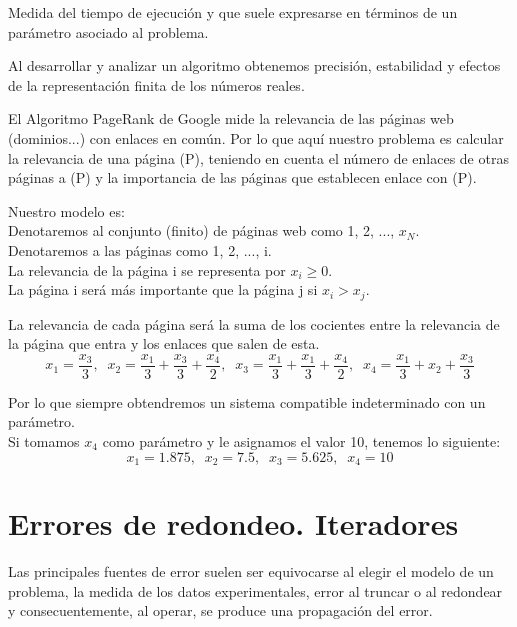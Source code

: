 \begin{ndef}
Medida del tiempo de ejecución y que suele expresarse en términos de un parámetro asociado al problema.
\end{ndef}

Al desarrollar y analizar un algoritmo obtenemos precisión, estabilidad y efectos de la representación finita de los números reales.

El Algoritmo PageRank de Google mide la relevancia de las páginas web (dominios...) con enlaces en común. Por lo que aquí nuestro problema es calcular la relevancia de una página (P), teniendo en cuenta el número de enlaces de otras páginas a (P) y la importancia de las páginas que establecen enlace con (P).

Nuestro modelo es:\\
Denotaremos al conjunto (finito) de páginas web como 1, 2, ..., $x_N$.\\
Denotaremos a las páginas como 1, 2, ..., i.\\
La relevancia de la página i se representa por $x_i \geq 0$.\\
La página i será más importante que la página j si $x_i > x_j$.

\begin{ejemplo}
La relevancia de cada página será la suma de los cocientes entre la relevancia de la página que entra y los enlaces que salen de esta.
\[ x_1 = \frac{x_3}{3}, \; \; x_2 = \frac{x_1}{3} + \frac{x_3}{3} + \frac{x_4}{2}, \; \; x_3 = \frac{x_1}{3} + \frac{x_1}{3} + \frac{x_4}{2}, \; \; x_4 = \frac{x_1}{3} + x_2 + \frac{x_3}{3} \]

Por lo que siempre obtendremos un sistema compatible indeterminado con un parámetro.\\

Si tomamos $x_4$ como parámetro y le asignamos el valor 10, tenemos lo siguiente:
\[ x_1 = 1.875, \; \; x_2 = 7.5, \; \; x_3 = 5.625, \; \; x_4 = 10 \]
\end{ejemplo}

\section{Errores de redondeo. Iteradores}
Las principales fuentes de error suelen ser equivocarse al elegir el modelo de un problema, la medida de los datos experimentales, error al truncar o al redondear y consecuentemente, al operar, se produce una propagación del error.

